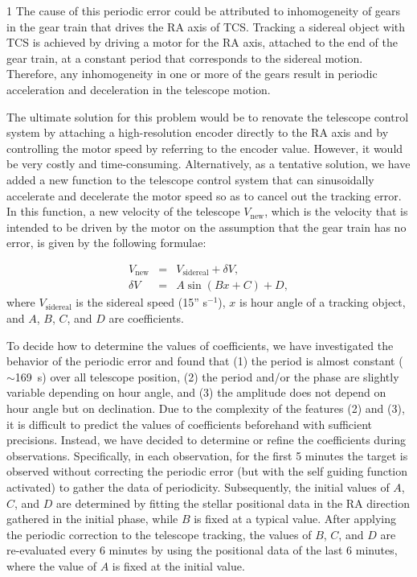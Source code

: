 \documentclass[a4paper,12pt]{spieman}  %
\begin{document}
\begin{spacing}{1}
The cause of this periodic error could be attributed to inhomogeneity of gears
in the gear train that drives the RA axis of TCS. 
Tracking a sidereal object with TCS is achieved by driving a motor for the RA axis,
attached to the end of the gear train, at a constant period that corresponds to the sidereal motion.
Therefore, any inhomogeneity in one or more of the gears result in periodic acceleration
and deceleration in the telescope motion.

The ultimate solution for this problem would be to renovate the telescope control system
by attaching a high-resolution encoder directly to the RA axis and
by controlling the motor speed by referring to the encoder value.
However, it would be very costly and time-consuming.
Alternatively, as a tentative solution, we have added a new function to the telescope control system
that can sinusoidally accelerate and decelerate the motor speed so as to cancel out the tracking error. 
In this function, a new velocity of the telescope $V_\mathrm{new}$, which is the velocity that is intended
to be driven by the motor on the assumption that the gear train has no error, is given by the following formulae:

\begin{eqnarray}
V_\mathrm{new} &=& V_\mathrm{sidereal} + \delta V,\\
\delta V &=& A \sin(B x + C) + D,
\end{eqnarray}
where $V_\mathrm{sidereal}$ is the sidereal speed (15'' s$^{-1}$), $x$ is hour angle of a tracking object,
and $A$, $B$, $C$, and $D$ are coefficients.

To decide how to determine the values of coefficients, we have investigated the behavior of the periodic error
and found that (1) the period is almost constant ($\sim$169~s) over all telescope position,
(2) the period and/or the phase are slightly variable depending on hour angle,
and (3) the amplitude does not depend on hour angle but on declination.
Due to the complexity of the features (2) and (3), it is difficult to predict the values of coefficients
beforehand with sufficient precisions.
Instead, we have decided to determine or refine the coefficients during observations.
Specifically, in each observation, for the first 5 minutes the target is observed without correcting
the periodic error (but with the self guiding function activated) to gather the data of periodicity.
Subsequently, the initial values of $A$, $C$, and $D$ are determined by fitting the stellar positional data
in the RA direction gathered in the initial phase, while $B$ is fixed at a typical value.
After applying the periodic correction to the telescope tracking,
the values of $B$, $C$, and $D$ are re-evaluated every 6 minutes by using the positional data
of the last 6 minutes, where the value of $A$ is fixed at the initial value.


\end{spacing}
\end{document}
